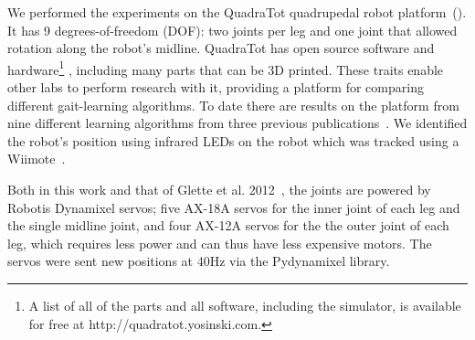
We performed the experiments on the QuadraTot quadrupedal robot platform~().
It has 9 degrees-of-freedom (DOF): two joints per leg and one joint that allowed rotation along the robot's midline. %
QuadraTot has open source software and hardware\footnote{A list of all of the parts and all software, including the simulator, is available for free at http://quadratot.yosinski.com.} %
, including many parts that can be 3D printed. These traits enable other labs to perform research with it, providing a platform for comparing different gait-learning algorithms. 
To date there are results on the platform from nine different learning algorithms from three previous publications~\cite{yos:clune,glette,haocheng}. We identified the robot's position using infrared LEDs on the robot which was tracked using a Wiimote~\cite{yos:clune}.

Both in this work and that of Glette et al. 2012~\cite{glette}, the joints are powered by Robotis Dynamixel servos; five AX-18A servos for the inner joint of each leg and the single midline joint, and four AX-12A servos for the the outer joint of each leg, which requires less power and can thus have less expensive motors. The servos were sent new positions at 40Hz via the Pydynamixel library. 

